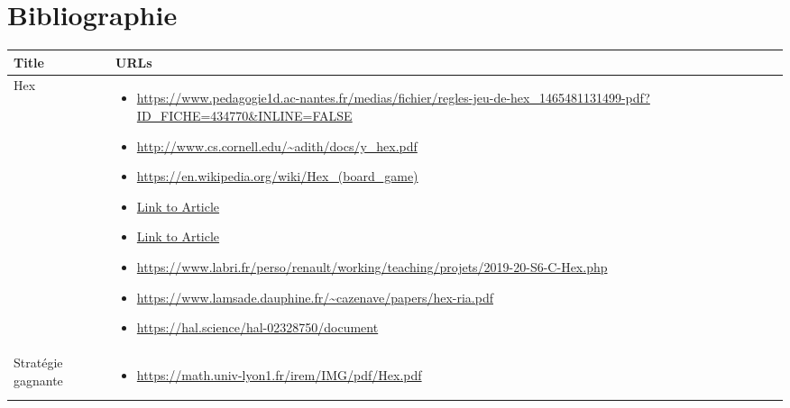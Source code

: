 \section{Bibliographie}




\sloppy
\begin{tabular}{|l|p{}|}
    \hline
    \textbf{Title} & \textbf{URLs} \\
    \hline
    Hex & 
    \begin{itemize}
        \item \href{https://www.pedagogie1d.ac-nantes.fr/medias/fichier/regles-jeu-de-hex_1465481131499-pdf?ID_FICHE=434770&INLINE=FALSE}{\url{https://www.pedagogie1d.ac-nantes.fr/medias/fichier/regles-jeu-de-hex_1465481131499-pdf?ID_FICHE=434770&INLINE=FALSE}}
        \item \href{http://www.cs.cornell.edu/~adith/docs/y_hex.pdf}{\url{http://www.cs.cornell.edu/~adith/docs/y_hex.pdf}}
        \item \href{https://en.wikipedia.org/wiki/Hex_(board_game)}{\url{https://en.wikipedia.org/wiki/Hex_(board_game)}}
        \item \href{https://gsurma.medium.com/hex-creating-intelligent-opponents-with-minimax-driven-ai-part-1-α-β-pruning-cc1df850e5bd}{Link to Article}
        \item \href{https://gsurma.medium.com/hex-creating-intelligent-adversaries-part-2-heuristics-dijkstras-algorithm-597e4dcacf93}{Link to Article}
        \item \href{https://www.labri.fr/perso/renault/working/teaching/projets/2019-20-S6-C-Hex.php}{\url{https://www.labri.fr/perso/renault/working/teaching/projets/2019-20-S6-C-Hex.php}}
        \item \href{https://www.lamsade.dauphine.fr/~cazenave/papers/hex-ria.pdf}{\url{https://www.lamsade.dauphine.fr/~cazenave/papers/hex-ria.pdf}}
        \item \href{https://hal.science/hal-02328750/document}{\url{https://hal.science/hal-02328750/document}}
    \end{itemize} \\
    \hline
    Stratégie gagnante & 
    \begin{itemize}
        \item \href{https://math.univ-lyon1.fr/irem/IMG/pdf/Hex.pdf}{\url{https://math.univ-lyon1.fr/irem/IMG/pdf/Hex.pdf}}

\end{itemize}
\end{tabular}
